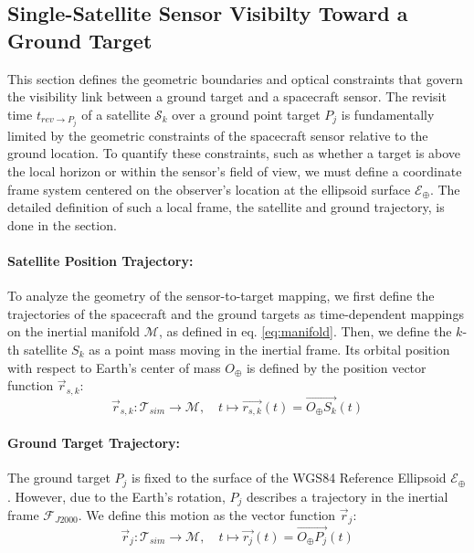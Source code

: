 \subsection{Single-Satellite Sensor Visibilty Toward a Ground Target}
This section defines the geometric boundaries and optical constraints that govern the visibility link between a ground target and a spacecraft sensor. The revisit time $t_{rev \to P_j}$ of a satellite $\mathcal{S}_{k}$ over a ground point target $P_{j}$ is fundamentally limited by the geometric constraints of the spacecraft sensor relative to the ground location. To quantify these constraints, such as whether a target is above the local horizon or within the sensor's field of view, we must define a coordinate frame system centered on the observer's location at the ellipsoid surface $\mathcal{E_\oplus}$. The detailed definition of such a local frame, the satellite and ground trajectory, is done in the section. 

\paragraph{Satellite Position Trajectory:}
To analyze the geometry of the sensor-to-target mapping, we first define the trajectories of the spacecraft and the ground targets as time-dependent mappings on the inertial manifold $\mathcal{M}$, as defined in eq. \ref{eq:manifold}. Then, we define the $k$-th satellite $S_k$ as a point mass moving in the inertial frame. Its orbital position with respect to Earth's center of mass $O_{\oplus}$ is defined by the position vector function $\vec{r}_{s,k}$:
\begin{equation}
    \vec{r}_{s,k} : \mathcal{T}_{sim} \to \mathcal{M}, \quad t \mapsto \overrightarrow{r_{s,k}}(t) = \overrightarrow{O_{\oplus}S_{k}}(t)
\end{equation}
\paragraph{Ground Target Trajectory:}
The ground target $P_j$ is fixed to the surface of the WGS84 Reference Ellipsoid $\mathcal{E}_\oplus$. However, due to the Earth's rotation, $P_j$ describes a trajectory in the inertial frame $\mathcal{F}_{J2000}$. We define this motion as the vector function $\vec{r}_j$:
\begin{equation}
    \vec{r}_{j} : \mathcal{T}_{sim} \to \mathcal{M}, \quad t \mapsto \overrightarrow{r_j}(t) = \overrightarrow{O_{\oplus}P_{j}}(t)
\end{equation}

